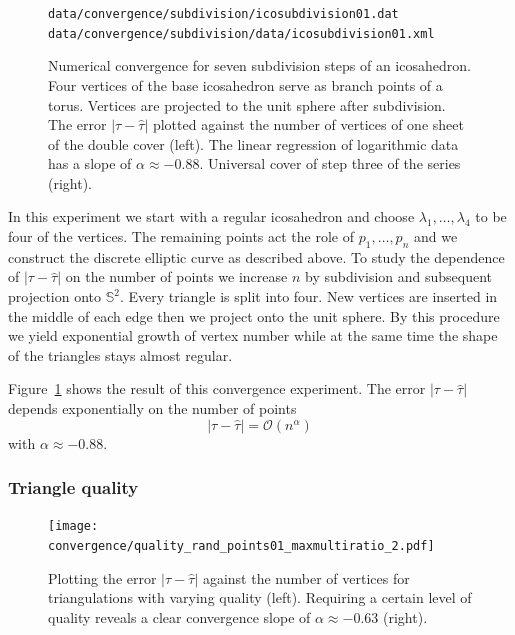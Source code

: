 \documentclass[Thesis]{subfiles}
\begin{document}
\begin{figure}
\centering
{}
{\scriptsize\tt data/convergence/subdivision/icosubdivision01.dat}\\
{\scriptsize\tt data/convergence/subdivision/data/icosubdivision01.xml}
\caption{Numerical convergence for seven subdivision steps of an icosahedron.
Four vertices of the base icosahedron serve as branch points of a torus.
Vertices are projected to the unit sphere after subdivision.
The error $|\tau - \hat\tau|$ plotted against the number of vertices of one sheet of the double cover (left).
The linear regression of logarithmic data has a slope of $\alpha\approx-0.88$.
Universal cover of step three of the series (right).
}
\label{fig:convergence_subdivision}
\end{figure}

In this experiment we start with a regular icosahedron and choose $\lambda_1,\ldots,\lambda_4$ to be four of the vertices. The remaining points act the role of $p_1,\ldots,p_n$ and we construct the discrete elliptic curve as described above. To study the dependence of $|\tau-\hat \tau|$ on the number of points we increase $n$ by subdivision and subsequent projection onto $\mathbb S^2$. Every triangle is split into four. New vertices are inserted in the middle of each edge then we project onto the unit sphere. By this procedure we yield exponential growth of vertex number while at the same time the shape of the triangles stays almost regular.

Figure~\ref{fig:convergence_subdivision} shows the result of this convergence experiment. The error $|\tau-\hat \tau|$ depends exponentially on the number of points
\[|\tau-\hat \tau|=\mathcal O (n^\alpha)\]
with $\alpha \approx -0.88$.

\subsubsection{Triangle quality}

\begin{figure}
\centering
\texttt{[image: convergence/quality\_rand\_points01\_maxmultiratio\_2.pdf]}
\caption{Plotting the error $|\tau - \hat\tau|$ against the number of vertices for triangulations with varying quality (left). Requiring a certain level of quality reveals a clear convergence slope of $\alpha\approx -0.63$ (right).}
\label{fig:convergence_quality}
\end{figure}
\end{document}

